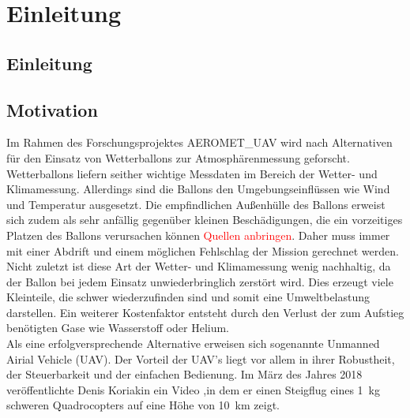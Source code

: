 \chapter{Einleitung}
\label{chap:Einleitung}

\section{Einleitung}
\label{sec:intro}

\section{Motivation}
\label{sec:motivation}
Im Rahmen des Forschungsprojektes AEROMET\_UAV wird nach Alternativen für den Einsatz von Wetterballons zur Atmosphärenmessung geforscht. Wetterballons liefern seither wichtige Messdaten im Bereich der Wetter- und Klimamessung. Allerdings sind die Ballons den Umgebungseinflüssen wie Wind und Temperatur ausgesetzt. Die empfindlichen Außenhülle des Ballons erweist sich zudem als sehr anfällig gegenüber kleinen Beschädigungen, die ein vorzeitiges Platzen des Ballons verursachen können \textcolor{red}{Quellen anbringen}. Daher muss immer mit einer Abdrift und einem möglichen Fehlschlag der Mission gerechnet werden. Nicht zuletzt ist diese Art der Wetter- und Klimamessung wenig nachhaltig, da der Ballon bei jedem Einsatz unwiederbringlich zerstört wird. Dies erzeugt viele Kleinteile, die schwer wiederzufinden sind und somit eine Umweltbelastung darstellen. Ein weiterer Kostenfaktor entsteht durch den Verlust der zum Aufstieg benötigten Gase wie Wasserstoff oder Helium.\\ 
Als eine erfolgversprechende Alternative erweisen sich sogenannte Unmanned Airial Vehicle (UAV). Der Vorteil der UAV's liegt vor allem in ihrer Robustheit, der Steuerbarkeit und der einfachen Bedienung. Im März des Jahres 2018 veröffentlichte Denis Koriakin ein Video \cite{Anderson.2018},in dem er einen Steigflug eines \SI{1}{kg} schweren Quadrocopters auf eine Höhe von \SI{10}{km} zeigt. 


